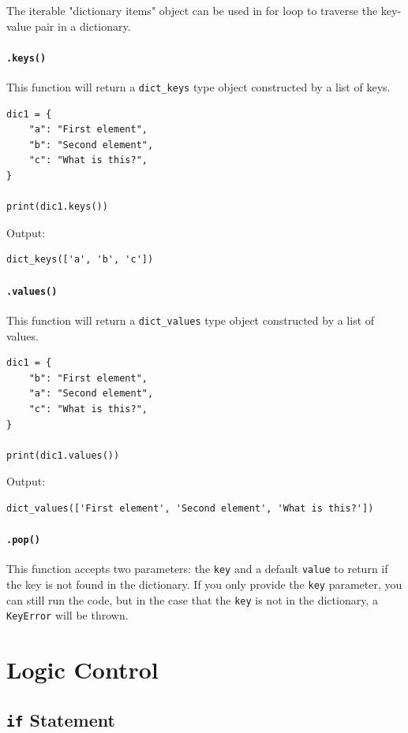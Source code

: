 \documentclass[12pt]{book}
\begin{document}
The iterable "dictionary items" object can be used in for loop to traverse the key-value pair in a dictionary.
\subsubsection{\texttt{.keys()}}
\label{sec:orgc1f5d0b}
This function will return a \texttt{dict\_keys} type object constructed by a list of keys.
\begin{verbatim}
dic1 = {
    "a": "First element",
    "b": "Second element",
    "c": "What is this?",
}

print(dic1.keys())
\end{verbatim}
Output:
\begin{verbatim}
dict_keys(['a', 'b', 'c'])
\end{verbatim}
\subsubsection{\texttt{.values()}}
\label{sec:org7cd30e7}
This function will return a \texttt{dict\_values} type object constructed by a list of values.
\begin{verbatim}
dic1 = {
    "b": "First element",
    "a": "Second element",
    "c": "What is this?",
}

print(dic1.values())
\end{verbatim}
Output:
\begin{verbatim}
dict_values(['First element', 'Second element', 'What is this?'])
\end{verbatim}
\subsubsection{\texttt{.pop()}}
\label{sec:org894a3be}
This function accepts two parameters: the \texttt{key} and a default \texttt{value} to return if the key is not found in the dictionary. If you only provide the \texttt{key} parameter, you can still run the code, but in the case that the \texttt{key} is not in the dictionary, a \texttt{KeyError} will be thrown.
\chapter{Logic Control}
\label{sec:orgcca0e59}
\section{\texttt{if} Statement}
\label{sec:orgf74b414}
\end{document}
